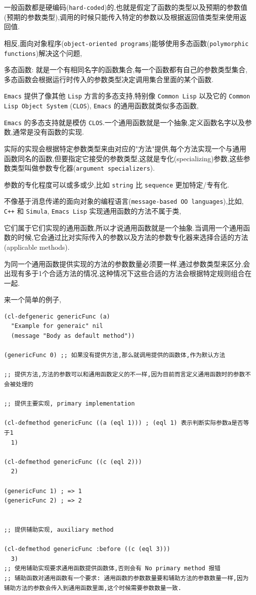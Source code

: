 \documentclass[11pt]{article}
\begin{document}
一般函数都是硬编码(\texttt{hard-coded})的,也就是假定了函数的类型以及预期的参数值(预期的参数类型),调用的时候只能传入特定的参数以及根据返回值类型来使用返回值.

相反,面向对象程序(\texttt{object-oriented programs})能够使用多态函数(\texttt{polymorphic functions})解决这个问题,

多态函数: 就是一个有相同名字的函数集合,每一个函数都有自己的参数类型集合,多态函数会根据运行时传入的参数类型决定调用集合里面的某个函数.

\texttt{Emacs} 提供了像其他 \texttt{Lisp} 方言的多态支持,特别像 \texttt{Common Lisp} 以及它的 \texttt{Common Lisp Object System} (\texttt{CLOS}), \texttt{Emacs} 的通用函数就类似多态函数,

\texttt{Emacs} 的多态支持就是模仿 \texttt{CLOS}.一个通用函数就是一个抽象,定义函数名字以及参数,通常是没有函数的实现.

实际的实现会根据特定参数类型来由对应的"方法"提供,每个方法实现一个与通用函数同名的函数,但要指定它接受的参数类型,这就是专化(specializing)参数,这些参数类型叫做参数专化器(\texttt{argument specializers}).

参数的专化程度可以或多或少,比如 \texttt{string} 比 \texttt{sequence} 更加特定/专有化.

不像基于消息传递的面向对象的编程语言(\texttt{message-based OO languages}),比如, \texttt{C++} 和 \texttt{Simula}, \texttt{Emacs Lisp} 实现通用函数的方法不属于类,

它们属于它们实现的通用函数,所以才说通用函数就是一个抽象.当调用一个通用函数的时候,它会通过比对实际传入的参数以及方法的参数专化器来选择合适的方法(applicable methods).

为同一个通用函数提供实现的方法的参数数量必须要一样,通过参数类型来区分,会出现有多于1个合适方法的情况,这种情况下这些合适的方法会根据特定规则组合在一起.

来一个简单的例子,

\begin{verbatim}
(cl-defgeneric genericFunc (a)
  "Example for generaic" nil
  (message "Body as default method"))

(genericFunc 0) ;; 如果没有提供方法,那么就调用提供的函数体,作为默认方法

;; 提供方法,方法的参数可以和通用函数定义的不一样,因为目前而言定义通用函数时的参数不会被处理的

;; 提供主要实现, primary implementation

(cl-defmethod genericFunc ((a (eql 1))) ; (eql 1) 表示判断实际参数a是否等于1
  1)

(cl-defmethod genericFunc ((c (eql 2)))
  2)

(genericFunc 1) ; => 1
(genericFunc 2) ; => 2


;; 提供辅助实现, auxiliary method

(cl-defmethod genericFunc :before ((c (eql 3)))
  3)
;; 使用辅助实现要求通用函数提供函数体,否则会有 No primary method 报错
;; 辅助函数对通用函数有一个要求: 通用函数的参数数量要和辅助方法的参数数量一样,因为辅助方法的参数会传入到通用函数里面,这个时候需要参数数量一致.

\end{verbatim}
\end{document}
